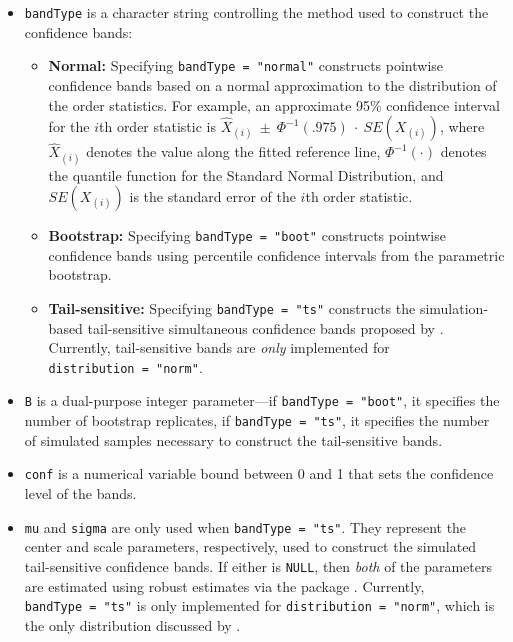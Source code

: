 \begin{itemize}
\item
  \texttt{bandType} is a character string controlling the method used to
  construct the confidence bands:

  \begin{itemize}
  \tightlist
  \item
    \textbf{Normal:} Specifying \texttt{bandType\ =\ "normal"}
    constructs pointwise confidence bands based on a normal
    approximation to the distribution of the order statistics. For
    example, an approximate 95\% confidence interval for the \(i\)th
    order statistic is
    \linebreak \(\widehat{X}_{(i)}~\pm~\Phi^{-1}(.975)~\cdot~SE(X_{(i)})\),
    where \(\widehat{X}_{(i)}\) denotes the value along the fitted
    reference line, \(\Phi^{-1}(\cdot)\) denotes the quantile function
    for the Standard Normal Distribution, and \(SE(X_{(i)})\) is the
    standard error of the \(i\)th order statistic.
  \item
    \textbf{Bootstrap:} Specifying \texttt{bandType\ =\ "boot"}
    constructs pointwise confidence bands using percentile confidence
    intervals from the parametric bootstrap.
  \item
    \textbf{Tail-sensitive:} Specifying \texttt{bandType\ =\ "ts"}
    constructs the simulation-based tail-sensitive simultaneous
    confidence bands proposed by \citet{Aldor-Noiman2013-xw}. Currently,
    tail-sensitive bands are \emph{only} implemented for
    \texttt{distribution\ =\ "norm"}.
  \end{itemize}
\item
  \texttt{B} is a dual-purpose integer parameter---if
  \texttt{bandType\ =\ "boot"}, it specifies the number of bootstrap
  replicates, if \texttt{bandType\ =\ "ts"}, it specifies the number of
  simulated samples necessary to construct the tail-sensitive bands.
\item
  \texttt{conf} is a numerical variable bound between 0 and 1 that sets
  the confidence level of the bands.
\item
  \texttt{mu} and \texttt{sigma} are only used when
  \texttt{bandType\ =\ "ts"}. They represent the center and scale
  parameters, respectively, used to construct the simulated
  tail-sensitive confidence bands. If either is \texttt{NULL}, then
  \emph{both} of the parameters are estimated using robust estimates via
  the  package \citep{robustbase}. Currently,
  \texttt{bandType\ =\ "ts"} is only implemented for
  \texttt{distribution\ =\ "norm"}, which is the only distribution
  discussed by \citet{Aldor-Noiman2013-xw}.
\end{itemize}

